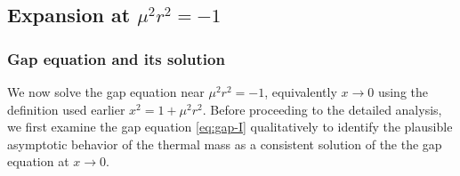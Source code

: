 \documentclass[a4paper,11pt]{article}
\begin{document}
\subsection{Expansion at $\mu^2r^2=-1$}
\subsubsection{Gap equation and its solution}
We now solve the gap equation near $\mu^2r^2=-1$, equivalently $x\to0$ using the definition used earlier $x^2=1+\mu^2r^2$.
Before proceeding to the detailed analysis, we first examine the gap equation \eqref{eq:gap-I} qualitatively to identify the plausible asymptotic behavior of the thermal mass as a consistent solution of the 
%
 the gap equation at $x\to 0$.
\end{document}
